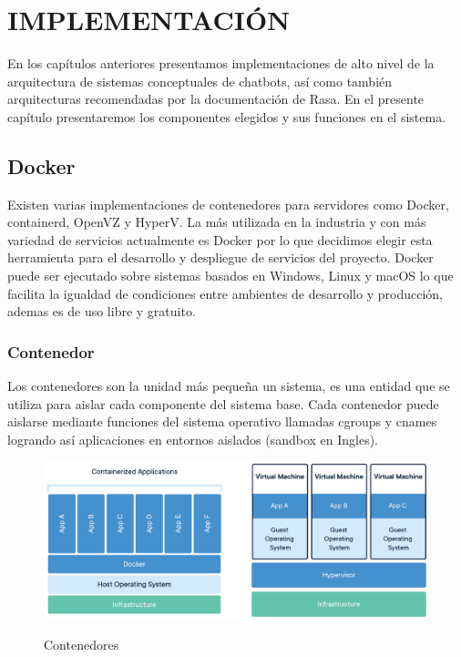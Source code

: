 \chapter[IMPLEMENTACIÓN]{IMPLEMENTACIÓN}
En los capítulos anteriores presentamos implementaciones de alto nivel de la arquitectura de
sistemas conceptuales de chatbots, así como también arquitecturas recomendadas por la documentación
de Rasa. En el presente capítulo presentaremos los componentes elegidos y sus funciones en el
sistema.

\section{Docker}
Existen varias implementaciones de contenedores para servidores como Docker, containerd, OpenVZ y
HyperV. La más utilizada en la industria y con más variedad de servicios actualmente es
Docker por lo que decidimos elegir esta herramienta para el desarrollo y despliegue de servicios del
proyecto. Docker puede ser ejecutado sobre sistemas basados en Windows, Linux y macOS lo que
facilita la igualdad de condiciones entre ambientes de desarrollo y producción, ademas es de uso
libre y gratuito. \cite{alternativas_docker}

\subsection{Contenedor}

Los contenedores son la unidad más pequeña un sistema, es una entidad que se utiliza para aislar
cada componente del sistema base. Cada contenedor puede aislarse mediante funciones del sistema
operativo llamadas cgroups y cnames logrando así aplicaciones en entornos aislados (sandbox en
Ingles). \cite{Docker}

\begin{figure}[ht]
	\centering
	\includegraphics[width=\textwidth]{imagenes/cap4/docker-container.png}
	\caption{Contenedores}
	\cite{Docker}
	\label{fig:container_diagram}
\end{figure}

